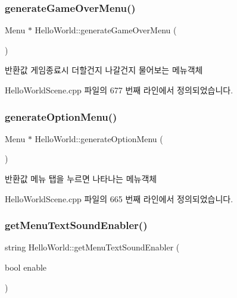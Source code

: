 \subsubsection{\texorpdfstring{generate\+Game\+Over\+Menu()}{generateGameOverMenu()}}
{\footnotesize\ttfamily Menu $\ast$ Hello\+World\+::generate\+Game\+Over\+Menu (\begin{DoxyParamCaption}{ }\end{DoxyParamCaption})\hspace{0.3cm}{\ttfamily [protected]}}

\begin{DoxyReturn}{반환값}
게임종료시 더할건지 나갈건지 물어보는 메뉴객체 
\end{DoxyReturn}


Hello\+World\+Scene.\+cpp 파일의 677 번째 라인에서 정의되었습니다.

\mbox{\label{class_hello_world_a24162678657656105f59887233f9c841}} 
\subsubsection{\texorpdfstring{generate\+Option\+Menu()}{generateOptionMenu()}}
{\footnotesize\ttfamily Menu $\ast$ Hello\+World\+::generate\+Option\+Menu (\begin{DoxyParamCaption}{ }\end{DoxyParamCaption})\hspace{0.3cm}{\ttfamily [protected]}}

\begin{DoxyReturn}{반환값}
메뉴 탭을 누르면 나타나는 메뉴객체 
\end{DoxyReturn}


Hello\+World\+Scene.\+cpp 파일의 665 번째 라인에서 정의되었습니다.

\mbox{\label{class_hello_world_a85e65e13718aba32a3a35044f0f694c5}} 
\subsubsection{\texorpdfstring{get\+Menu\+Text\+Sound\+Enabler()}{getMenuTextSoundEnabler()}}
{\footnotesize\ttfamily string Hello\+World\+::get\+Menu\+Text\+Sound\+Enabler (\begin{DoxyParamCaption}\item[{bool}]{enable }\end{DoxyParamCaption})\hspace{0.3cm}{\ttfamily [protected]}}

